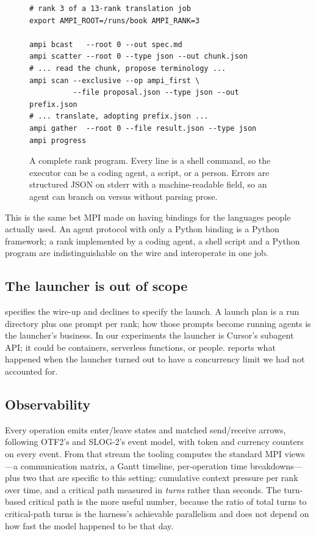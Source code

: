 \begin{figure}[t]
\begin{lstlisting}[language=ampishell]
# rank 3 of a 13-rank translation job
export AMPI_ROOT=/runs/book AMPI_RANK=3

ampi bcast   --root 0 --out spec.md
ampi scatter --root 0 --type json --out chunk.json
# ... read the chunk, propose terminology ...
ampi scan --exclusive --op ampi_first \
          --file proposal.json --type json --out prefix.json
# ... translate, adopting prefix.json ...
ampi gather  --root 0 --file result.json --type json
ampi progress
\end{lstlisting}
\caption{A complete rank program. Every line is a shell command, so the
executor can be a coding agent, a script, or a person. Errors are structured
JSON on stderr with a machine-readable \code{error} field, so an agent can
branch on \op{ERR\_TIMEOUT} versus \op{ERR\_REVOKED} without parsing prose.}
\label{fig:cli}
\end{figure}

This is the same bet MPI made on having bindings for the languages people
actually used. An agent protocol with only a Python binding is a Python
framework; a rank implemented by a coding agent, a shell script and a Python
program are indistinguishable on the wire and interoperate in one job.

\subsection{The launcher is out of scope}

\ampi{} specifies the wire-up and declines to specify the launch. A launch
plan is a run directory plus one prompt per rank; how those prompts become
running agents is the launcher's business. In our experiments the launcher
is Cursor's subagent API; it could be containers, serverless functions, or
people. \Cref{sec:discussion} reports what happened when the launcher turned
out to have a concurrency limit we had not accounted for.

\subsection{Observability}

Every operation emits enter/leave states and matched send/receive arrows,
following OTF2's and SLOG-2's event model, with token and currency counters
on every event. From that stream the tooling computes the standard MPI
views---a communication matrix, a Gantt timeline, per-operation time
breakdowns---plus two that are specific to this setting: cumulative context
pressure per rank over time, and a critical path measured in \emph{turns}
rather than seconds. The turn-based critical path is the more useful number,
because the ratio of total turns to critical-path turns is the harness's
achievable parallelism and does not depend on how fast the model happened to
be that day.

